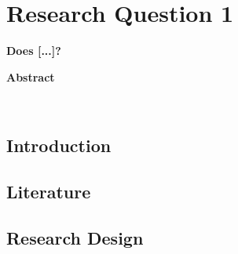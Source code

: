 \chapter{Research Question 1} \label{cha:essay1}
\thispagestyle{empty}
{\noindent \Large \textbf{Does [...]?}}
\vspace{1cm}


\therule
\centerline{\textbf{Abstract}} \\
 \par
\therule

\section*{Introduction} \label{sec:essay1_introduction}



\section{Literature} \label{sec:essay1_literature}



\section{Research Design} \label{sec:essay1_design}


